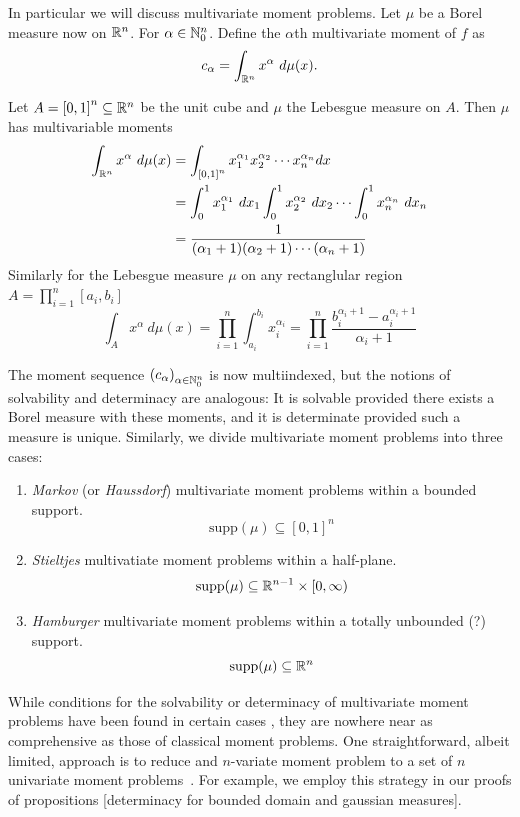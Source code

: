 In particular we will discuss multivariate moment problems. Let $\mu$ be a Borel measure now on $\mathbb{R}^n$. For $\alpha \in \mathbb{N}_0^n$. Define the $\alpha$th multivariate moment of $f$ as 
\[
  c_\alpha = \int_{\mathbb{R}^n} x^\alpha ~d\mu(x).
\]
\begin{myexample}
  Let $A = {[0,1]}^n \subseteq \mathbb{R}^n$ be the unit cube and $\mu$ the Lebesgue measure on $A$. Then $\mu$ has multivariable moments
  \begin{align*}
    \int_{\mathbb{R}^n} x^\alpha ~d\mu(x) 
    &= \int_{{[0,1]}^n} x_1^{\alpha_1}x_2^{\alpha_2} \cdots x_n^{\alpha_n} dx \\
    &= \int_0^1 x_1^{\alpha_1} ~dx_1 \int_0^1 x_2^{\alpha_2} ~dx_2 \cdots \int_0^1 x_n^{\alpha_n} ~dx_n \\
    &= \frac{1}{(\alpha_1+1) (\alpha_2+1) \cdots (\alpha_n+1)}
  \end{align*}
  Similarly for the Lebesgue measure $\mu$ on any rectanglular region $A = \prod_{i = 1}^n [a_i, b_i]$
  \[
    \int_A x^\alpha ~d\mu(x) 
    = \prod_{i=1}^n \int_{a_i}^{b_i} x_i^{\alpha_i}
    = \prod_{i = 1}^n \frac{b_i^{\alpha_i + 1} - a_i^{\alpha_i + 1}}{\alpha_i + 1}
  \]
\end{myexample}
The moment sequence ${(c_\alpha)}_{\alpha \in \mathbb{N}_0^n}$ is now multiindexed, but the notions of solvability and determinacy are analogous: It is solvable provided there exists a Borel measure with these moments, and it is determinate provided such a measure is unique. Similarly, we divide multivariate moment problems into three cases:



\begin{enumerate}[label=]
  \item \emph{Markov} (or \emph{Haussdorf}) multivariate moment problems within a bounded support.
  \[
    \text{supp}(\mu) \subseteq {[0,1]}^n
  \]
  \item \emph{Stieltjes} multivatiate moment problems within a half-plane. 
  \[
    \text{supp}(\mu) \subseteq \mathbb{R}^{n-1} \times [0, \infty)
  \]
  \item \emph{Hamburger} multivariate moment problems within a totally unbounded (?) support.
  \[
    \text{supp}(\mu) \subseteq \mathbb{R}^n
  \]
\end{enumerate}

While conditions for the solvability or determinacy of multivariate moment problems have been found in certain cases \cn, they are nowhere near as comprehensive as those of classical moment problems. One straightforward, albeit limited, approach is to reduce and $n$-variate moment problem to a set of $n$ univariate moment problems~\cite{Pete82}. For example, we employ this strategy in our proofs of propositions [determinacy for bounded domain and gaussian measures].

